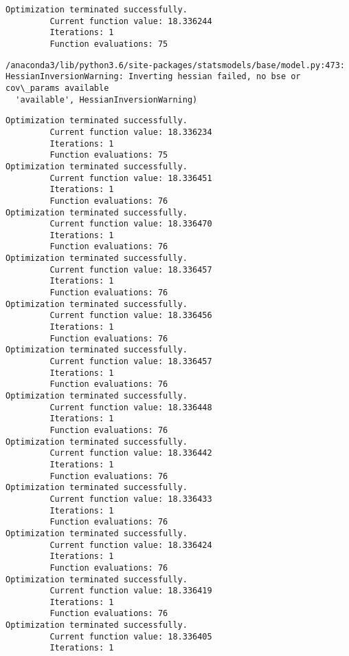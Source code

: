 \documentclass[11pt]{article}
\begin{document}
    \begin{Verbatim}[commandchars=\\\{\}]
Optimization terminated successfully.
         Current function value: 18.336244
         Iterations: 1
         Function evaluations: 75

    \end{Verbatim}

    \begin{Verbatim}[commandchars=\\\{\}]
/anaconda3/lib/python3.6/site-packages/statsmodels/base/model.py:473: HessianInversionWarning: Inverting hessian failed, no bse or cov\_params available
  'available', HessianInversionWarning)

    \end{Verbatim}

    \begin{Verbatim}[commandchars=\\\{\}]
Optimization terminated successfully.
         Current function value: 18.336234
         Iterations: 1
         Function evaluations: 75
Optimization terminated successfully.
         Current function value: 18.336451
         Iterations: 1
         Function evaluations: 76
Optimization terminated successfully.
         Current function value: 18.336470
         Iterations: 1
         Function evaluations: 76
Optimization terminated successfully.
         Current function value: 18.336457
         Iterations: 1
         Function evaluations: 76
Optimization terminated successfully.
         Current function value: 18.336456
         Iterations: 1
         Function evaluations: 76
Optimization terminated successfully.
         Current function value: 18.336457
         Iterations: 1
         Function evaluations: 76
Optimization terminated successfully.
         Current function value: 18.336448
         Iterations: 1
         Function evaluations: 76
Optimization terminated successfully.
         Current function value: 18.336442
         Iterations: 1
         Function evaluations: 76
Optimization terminated successfully.
         Current function value: 18.336433
         Iterations: 1
         Function evaluations: 76
Optimization terminated successfully.
         Current function value: 18.336424
         Iterations: 1
         Function evaluations: 76
Optimization terminated successfully.
         Current function value: 18.336419
         Iterations: 1
         Function evaluations: 76
Optimization terminated successfully.
         Current function value: 18.336405
         Iterations: 1

\end{Verbatim}
\end{document}
